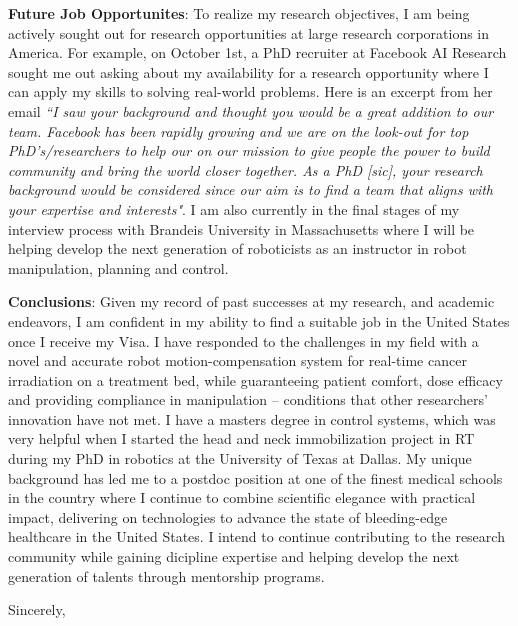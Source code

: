 \documentclass[11pt,letterpaper]{letter} %
\begin{document}
\begin{letter}
	\noindent\textbf{Future Job Opportunites}: To realize my research objectives, I am being actively sought out for research opportunities at large research corporations in America. For example, on October 1st, a PhD recruiter at Facebook AI Research sought me out asking about my availability for a research opportunity  where I can apply my skills to solving real-world problems. Here is an excerpt from her email  \textit{``I saw your background and thought you would be a great addition to our team. Facebook has been rapidly growing and we are on the look-out for top PhD's/researchers to help our on our mission to give people the power to build community and bring the world closer together. As a PhD [sic], your research background would be considered since our aim is to find a team that aligns with your expertise and interests"}. I am also currently in the final stages of my interview process with Brandeis University in Massachusetts where I will be helping develop the next generation of roboticists as an instructor in robot manipulation, planning and control.
	
	\noindent\textbf{Conclusions}: Given my record of past successes at my research, and academic endeavors, I am confident in my ability to find a suitable job in the United States once I receive my Visa. I have responded to the challenges in my field with a novel and accurate robot motion-compensation system for real-time cancer irradiation on a treatment bed, while guaranteeing patient comfort, dose efficacy and providing compliance in manipulation -- conditions that other researchers' innovation have not met. I have a masters degree in control systems, which was very helpful when I started the head and neck immobilization project in RT during my PhD in robotics at the University of Texas at Dallas. My unique background has led me to a postdoc position at one of the finest medical schools in the country where I continue to combine scientific elegance with practical impact, delivering on technologies to advance the state of bleeding-edge healthcare in the United States. I intend to continue contributing to the research community while gaining dicipline expertise and helping develop the next generation of talents through mentorship programs.
	
	\closing{Sincerely,}
	
	
\end{letter}
\end{document}
